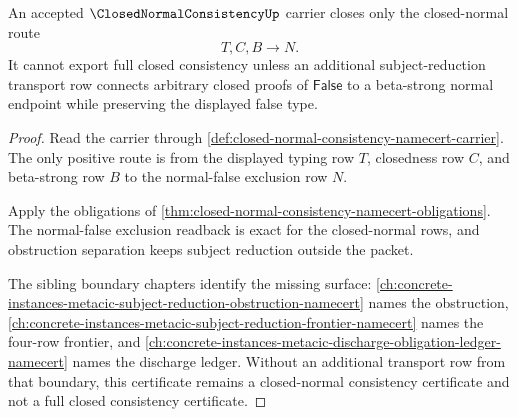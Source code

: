 \begin{theorem}
\label{thm:closed-normal-consistency-subject-reduction-boundary}
An accepted $\ClosedNormalConsistencyUp$ carrier closes only the closed-normal route
$$
T,C,B \to N.
$$
It cannot export full closed consistency unless an additional subject-reduction transport row connects arbitrary closed proofs of $\mathsf{False}$ to a beta-strong normal endpoint while preserving the displayed false type.
\end{theorem}
\begin{proof}
Read the carrier through \autoref{def:closed-normal-consistency-namecert-carrier}. The only positive route is from the displayed typing row $T$, closedness row $C$, and beta-strong row $B$ to the normal-false exclusion row $N$.

Apply the obligations of \autoref{thm:closed-normal-consistency-namecert-obligations}. The normal-false exclusion readback is exact for the closed-normal rows, and obstruction separation keeps subject reduction outside the packet.

The sibling boundary chapters identify the missing surface: \autoref{ch:concrete-instances-metacic-subject-reduction-obstruction-namecert} names the obstruction, \autoref{ch:concrete-instances-metacic-subject-reduction-frontier-namecert} names the four-row frontier, and \autoref{ch:concrete-instances-metacic-discharge-obligation-ledger-namecert} names the discharge ledger. Without an additional transport row from that boundary, this certificate remains a closed-normal consistency certificate and not a full closed consistency certificate.
\end{proof}


\begin{closurestatus}{\ClosedNormalConsistencyUp}
  \theoryclosure{\seedClosure}
  \formalstatus{\unformalizedV}
\end{closurestatus}
